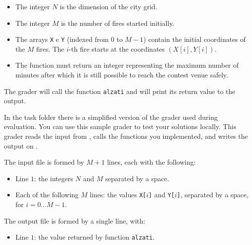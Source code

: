 \begin{itemize}[nolistsep]
  \item The integer $N$ is the dimension of the city grid.
  \item The integer $M$ is the number of fires started initially.
  \item The arrays \texttt{X} e \texttt{Y} (indexed from $0$ to $M-1$) contain
  	    the initial coordinates of the $M$ fires. The $i$-th fire starts at the
  	    coordinates $(X[i], Y[i])$.
  \item The function must return an integer representing the maximum number of
  		minutes after which it is still possible to reach the contest venue
  		safely.
\end{itemize}

\medskip

The grader will call the function \texttt{alzati} and will print its return
value to the output.



\Grader

In the task folder there is a simplified version of the grader used during
evaluation. You can use this sample grader to test your solutions locally. This
grader reads the input from , calls the functions you implemented,
and writes the output on \outputfile{}.

The input file is formed by $M+1$ lines, each with the following:
\begin{itemize}[nolistsep,itemsep=2mm]
\item Line $1$: the integers $N$ and $M$ separated by a space.
\item Each of the following $M$ lines: the values \texttt{X[$i$]} and \texttt{Y[$i$]}, separated by a space, for $i = 0\ldots M-1$.
\end{itemize}

The output file is formed by a single line, with:
\begin{itemize}[nolistsep,itemsep=2mm]
\item Line $1$: the value returned by function \texttt{alzati}.
\end{itemize}



